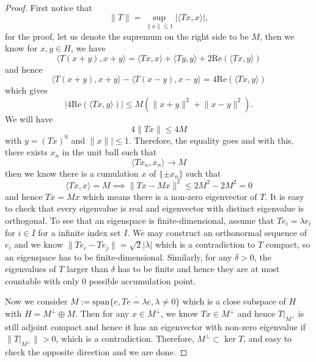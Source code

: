 \appendix

\section{}

\subsection{}

\begin{theorem}
    $\label{prove_specT}$
\end{theorem}
\begin{proof}
    First notice that
    \[
    \lVert T \rVert = \sup_{\lVert x \rVert \leq 1}|\langle Tx,x\rangle|,
    \]
    for the proof, let us denote the supremum on the right side to be $M$, then we know for $x,y\in H$, we have
    \[
    \langle T(x+y), x+y\rangle = \langle Tx, x\rangle + \langle Ty, y\rangle + 2 \text{Re}(\langle Tx ,y \rangle)
    \]
    and hence
    \[
    \langle T(x+y), x+y\rangle - \langle T(x-y), x-y\rangle = 4\text{Re}(\langle Tx,y\rangle)
    \]
    which gives
    \[
    |4\text{Re}(\langle Tx,y\rangle)| \leq M(\lVert x+y\rVert^2 + \lVert x-y\rVert^2).
    \]
    We will have 
    \[
    4 \lVert Tx\rVert \leq 4M
    \]
    with $y = (Tx)^0$ and $\lVert x\rVert |\leq 1$. Therefore, the equality goes and with this, there exists $x_n$ in the unit ball such that
    \[
    \langle Tx_n, x_n\rangle \to M 
    \]
    then we know there is a cumulation $x$ of $\{\pm x_n\}$ such that
    \[
    \langle Tx, x \rangle = M \implies \lVert Tx - Mx\rVert^2 \leq 2M^2 - 2M^2 = 0  
    \]
    and hence $Tx = Mx$ which means there is a non-zero eigenvector of $T$. It is easy to check that every eigenvalue is real and eigenvector with distinct eigenvalue is orthogonal. To see that an eigenspace is finite-dimensional, assume that $Te_{i} = \lambda e_i$ for $i\in I$ for a infinite index set $I$. We may construct an orthonormal sequence of $e_i$ and we know $\lVert Te_i - Te_j\rVert = \sqrt{2}|\lambda|$ which is a contradiction to $T$ compact, so an eigenspace has to be finite-dimensional. Similarly, for any $\delta > 0$, the eigenvalues of $T$ larger than $\delta$ has to be finite and hence they are at most countable with only $0$ possible accumulation point.\par
    Now we consider $M:=\overline{\text{span}\{e, Te = \lambda e, \lambda \neq 0\}}$ which is a close subspace of $H$ with $H = M^{\perp} \oplus M$. Then for any $x \in M^{\perp}$, we know $Tx \in M^{\perp}$ and hence $T|_{M^{\perp}}$ is still adjoint compact and hence it has an eigenvector with non-zero eigenvalue if $\lVert T|_{M^{\perp}}\rVert > 0$, which is a contradiction. Therefore, $M^{\perp} \subset \ker T$, and easy to check the opposite direction and we are done.
\end{proof}